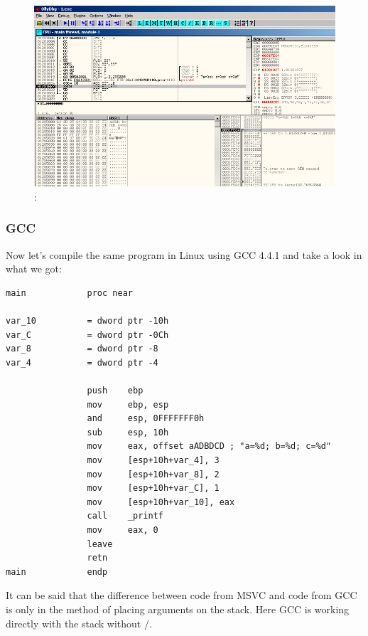 \begin{figure}[H]
\centering
\includegraphics[scale=0.66]{patterns/03_printf/olly3_4.png}
\caption{\olly:  }
\label{fig:printf3_olly_4}
\end{figure}

\subsubsection{GCC}

{Now let's compile the same program in Linux using GCC 4.4.1 and take a look in \IDA what we got:}

\begin{lstlisting}
main            proc near

var_10          = dword ptr -10h
var_C           = dword ptr -0Ch
var_8           = dword ptr -8
var_4           = dword ptr -4

                push    ebp
                mov     ebp, esp
                and     esp, 0FFFFFFF0h
                sub     esp, 10h
                mov     eax, offset aADBDCD ; "a=%d; b=%d; c=%d"
                mov     [esp+10h+var_4], 3
                mov     [esp+10h+var_8], 2
                mov     [esp+10h+var_C], 1
                mov     [esp+10h+var_10], eax
                call    _printf
                mov     eax, 0
                leave
                retn
main            endp
\end{lstlisting}

{It can be said that the difference between code from MSVC and code from GCC is only in the method of placing arguments on the stack.
Here GCC is working directly with the stack without \PUSH/\POP.}

